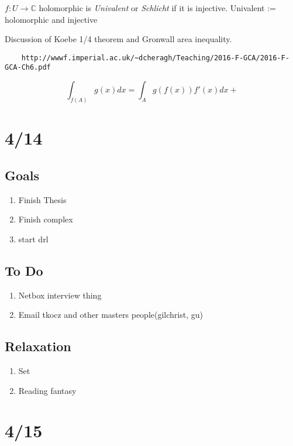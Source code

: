 \documentclass[11pt]{article}
\theoremstyle{remark}
\begin{document}
$f : U \to \mathbb{C}$ holomorphic is \textit{Univalent} or \textit{Schlicht} if it is injective. Univalent := holomorphic and injective

Discussion of Koebe 1/4 theorem and Gronwall area inequality.

\begin{verbatim}
	http://wwwf.imperial.ac.uk/~dcheragh/Teaching/2016-F-GCA/2016-F-GCA-Ch6.pdf
\end{verbatim}

\begin{equation*}
	\int_{f(A)}g(x)dx = \int_Ag(f(x))f'(x)dx+
\end{equation*}

\section{4/14}

\subsection{Goals}

\begin{enumerate}
	\item Finish Thesis
	\item Finish complex
	\item start drl
\end{enumerate}

\subsection{To Do}

\begin{enumerate}
	\item Netbox interview thing
	\item Email tkocz and other masters people(gilchrist, gu)
\end{enumerate}

\subsection{Relaxation}

\begin{enumerate}
	\item Set
	\item Reading fantasy
\end{enumerate}

\section{4/15}
\end{document}
